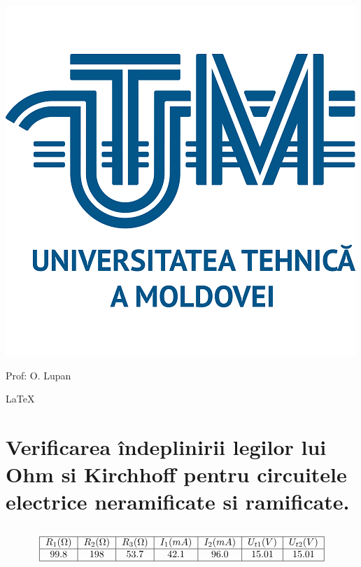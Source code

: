 \documentclass{article}
\begin{document}
	\centering
	\includegraphics{imgs/UTM_logo.png}

	\begin{flushright}
		Prof: O. Lupan
	\end{flushright}

	\LaTeX
	\pagebreak %

	\raggedright
	\section{Verificarea îndeplinirii legilor lui Ohm si Kirchhoff pentru circuitele electrice neramificate si ramificate.}

		\subsection{}
			\[
				\begin{tabular}{|c|c|c|c|c|c|c|c|}
					\hline
					$R_1 (\Omega)$ & $R_2 (\Omega)$ & $R_3 (\Omega)$ & $I_1 (mA)$ & $I_2 (mA)$ & $U_{t1} (V)$ & $U_{t2} (V)$\\
					\hline
					\ROne & \RTwo & \RThree & \IPosOne & \IPosTwo& 15.01 & 15.01\\
					\hline
				\end{tabular}
			\]
\end{document}
